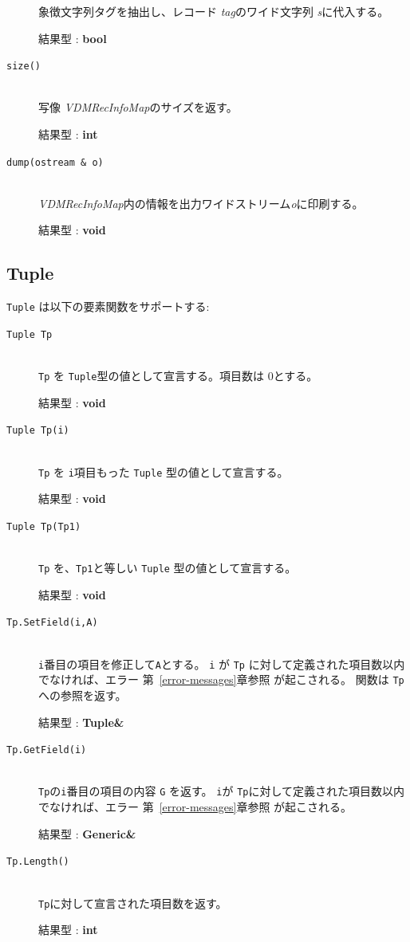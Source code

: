 \documentclass[\pformat,12pt]{jarticle}
\begin{document}
\begin{description}
  象徴文字列タグを抽出し、レコード {\em tag}のワイド文字列 {\em s}に代入する。

  結果型 : {\bf bool}

\item[{\tt size()}]  \mbox{}\\

  写像 {\em VDMRecInfoMap}のサイズを返す。

  結果型 : {\bf int}

\item[{\tt dump(ostream \& o)}]  \mbox{}\\

   {\em VDMRecInfoMap}内の情報を出力ワイドストリーム{\em o}に印刷する。

  結果型 : {\bf void}

\end{description}


\subsection{Tuple}
{\tt Tuple} は以下の要素関数をサポートする:

\vspace{0.5cm}

\begin{description}
\item[{\tt Tuple Tp}] \mbox{}\\
      {\tt Tp} を {\tt Tuple}型の値として宣言する。項目数は 0とする。

     結果型 : {\bf void}

\item[{\tt Tuple Tp(i)}] \mbox{}\\
     {\tt Tp} を {\tt i}項目もった {\tt Tuple} 型の値として宣言する。

     結果型 : {\bf void}

\item[{\tt Tuple Tp(Tp1)}] \mbox{}\\
      {\tt Tp} を、{\tt Tp1}と等しい {\tt Tuple} 型の値として宣言する。

     結果型 : {\bf void}

\item[{\tt Tp.SetField(i,A)}] \mbox{}\\
     {\tt i}番目の項目を修正して{\tt A}とする。 
 {\tt i} が {\tt Tp} に対して定義された項目数以内でなければ、エラー 第~\ref{error-messages}章参照 が起こされる。
関数は {\tt Tp}への参照を返す。

     結果型 : {\bf Tuple\&}

\item[{\tt Tp.GetField(i)}] \mbox{}\\
      {\tt Tp}の{\tt i}番目の項目の内容 {\tt G} を返す。
      {\tt i}が {\tt Tp}に対して定義された項目数以内でなければ、エラー 第~\ref{error-messages}章参照 が起こされる。

     結果型 : {\bf Generic\&}

\item[{\tt Tp.Length()}] \mbox{}\\
      {\tt Tp}に対して宣言された項目数を返す。

     結果型 : {\bf int}
\end{description}
\end{document}
